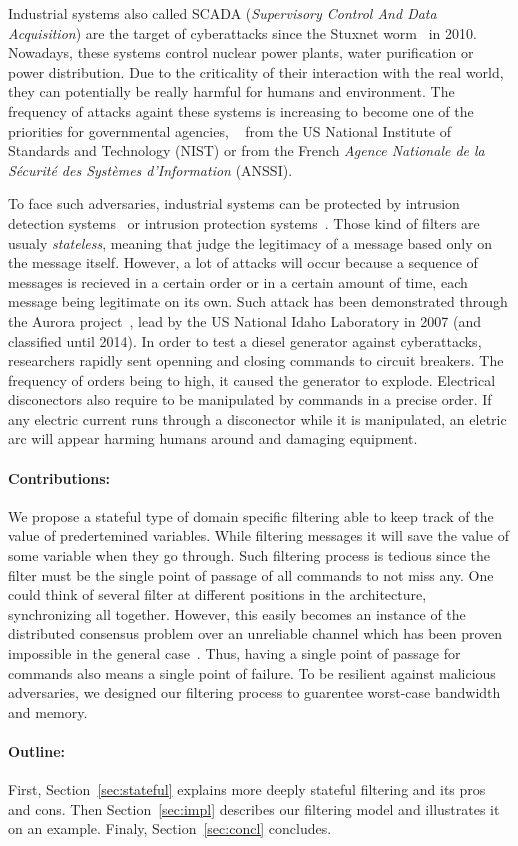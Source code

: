 Industrial systems also called SCADA (\emph{Supervisory Control And
Data Acquisition}) are the target of cyberattacks since the Stuxnet
worm~\cite{Lan11} in 2010.
Nowadays, these systems control nuclear power plants, water purification or
power distribution.
Due to the criticality of their interaction with the real world, they can
potentially be really harmful for humans and environment.
The frequency of attacks againt these systems is increasing to become one of the
priorities for governmental agencies, \eg~\cite{SFS11} from the US
National Institute of Standards and Technology (NIST) or
\cite{ANSSI12_guide_securite_industrielle_en} from the French {\em Agence
Nationale de la Sécurité des Systèmes d'Information} (ANSSI).

To face such adversaries, industrial systems can be protected by intrusion
detection systems~\cite{StoneGate13,Pax99,Suricata,Snort} or intrusion
protection systems~\cite{DESIRE10,StoneGate11,rWeb13,DZNetwork14}.
Those kind of filters are usualy {\em stateless}, meaning that judge the 
legitimacy of a message based only on the message itself.
However, a lot of attacks will occur because a sequence of messages is recieved
in a certain order or in a certain amount of time, each message being legitimate
on its own.
Such attack has been demonstrated through the Aurora project~\cite{Aurora}, lead
by the US National Idaho Laboratory in 2007 (and classified until 2014).
In order to test a diesel generator against cyberattacks, researchers rapidly 
sent openning and closing commands to circuit breakers.
The frequency of orders being to high, it caused the generator to explode.
Electrical disconectors also require to be manipulated by commands in a precise
order.
If any electric current runs through a disconector while it is manipulated, an
eletric arc will appear harming humans around and damaging equipment.

\paragraph{Contributions:} We propose a stateful type of domain specific
filtering able to keep track of the value of predertemined variables.
While filtering messages it will save the value of some variable when they go
through.
Such filtering process is tedious since the filter must be the single point of
passage of all commands to not miss any.
One could think of several filter at different positions in the architecture,
synchronizing all together.
However, this easily becomes an instance of the distributed consensus problem
over an unreliable channel which has been proven impossible in the general
case~\cite{FLP85}.
Thus, having a single point of passage for commands also means a single point of
failure.
To be resilient against malicious adversaries, we designed our filtering process
to guarentee worst-case bandwidth and memory.


\paragraph{Outline:} First, Section~\ref{sec:stateful} explains more deeply
stateful filtering and its pros and cons.
Then Section~\ref{sec:impl} describes our filtering model and illustrates it on
an example.
Finaly, Section~\ref{sec:concl} concludes.
